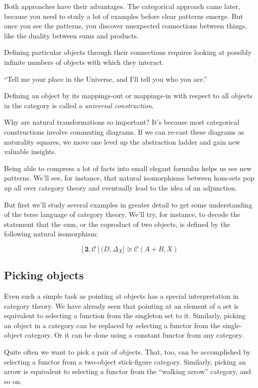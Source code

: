\documentclass[DaoFP]{subfiles}
\begin{document}
Both approaches have their advantages. The categorical approach came later, because you need to study a lot of examples before clear patterns emerge. But once you see the patterns, you discover unexpected connections between things, like the duality between sums and products.

Defining particular objects through their connections requires looking at possibly infinite numbers of objects with which they interact. 

``Tell me your place in the Universe, and I'll tell you who you are.''

Defining an object by its mappings-out or mappings-in with respect to all objects in the category is called a \emph{universal construction}. 

Why are natural transformations so important? It's because most categorical constructions involve commuting diagrams. If we can re-cast these diagrams as naturality squares, we move one level up the abstraction ladder and gain new valuable insights.

Being able to compress a lot of facts into small elegant formulas helps us see new patterns. We'll see, for instance, that natural isomorphisms between hom-sets pop up all over category theory and eventually lead to the idea of an adjunction.

But first we'll study several examples in greater detail to get some understanding of the terse language of category theory. We'll try, for instance, to decode the statement that the sum, or the coproduct of two objects, is defined by the following natural isomorphism:

\[ [\mathbf{2}, \mathcal{C}](D, \Delta_X]  \cong \mathcal{C}(A + B, X) \]



\subsection{Picking objects}

Even such a simple task as pointing at objects has a special interpretation in category theory. We have already seen that pointing at an element of a set is equivalent to selecting a function from the singleton set to it. Similarly, picking an object in a category can be replaced by selecting a functor from the single-object category. Or it can be done using a constant functor from any category. 

Quite often we want to pick a pair of objects. That, too, can be accomplished by selecting a functor from a two-object stick-figure category. Similarly, picking an arrow is equivalent to selecting a functor from the ``walking arrow'' category, and so on.
\end{document}
